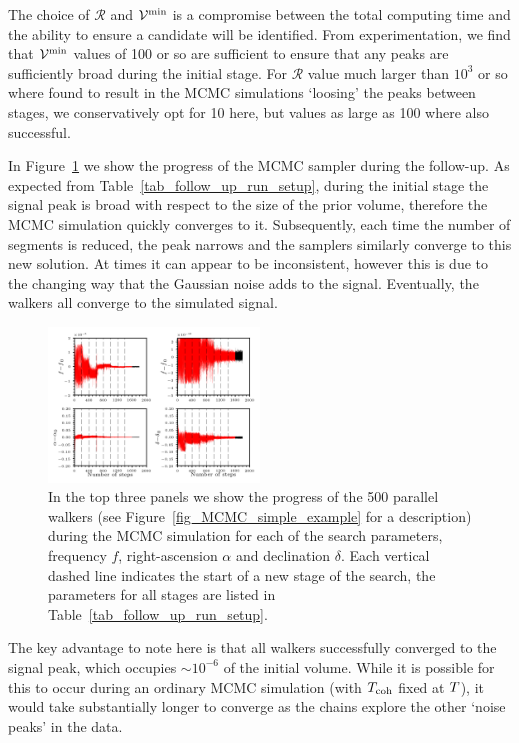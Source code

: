 \documentclass[aps, prd, twocolumn, superscriptaddress, floatfix, showpacs, nofootinbib, longbibliography]{revtex4-1}
\begin{document}
The choice of $\mathcal{R}$ and $\mathcal{V}^{\rm min}$ is a compromise between the
total computing time and the ability to ensure a candidate will be identified.
From experimentation, we find that $\mathcal{V}^{\rm min}$ values of 100 or so are
sufficient to ensure that any peaks are sufficiently broad during the
initial stage. For $\mathcal{R}$ value much larger than $10^{3}$ or so where
found to result in the MCMC simulations `loosing' the peaks between stages, we
conservatively opt for 10 here, but values as large as 100 where also successful.

In Figure~\ref{fig_follow_up} we show the progress of the MCMC sampler during
the follow-up.  As expected from Table~\ref{tab_follow_up_run_setup}, during
the initial stage the signal peak is broad with respect to the size of the
prior volume, therefore the MCMC simulation quickly converges to it. Subsequently,
each time the number of segments is reduced, the peak narrows and the samplers
similarly converge to this new solution. At times it can appear to be inconsistent,
however this is due to the changing way that the Gaussian noise adds to the signal.
Eventually, the walkers all converge to the simulated signal.
\begin{figure}[htb]
\centering
\includegraphics[width=0.5\textwidth]{follow_up_walkers}
\caption{In the top three panels we show the progress of the 500 parallel
walkers (see Figure~\ref{fig_MCMC_simple_example} for a description) during the
MCMC simulation for each of the search parameters, frequency $f$,
right-ascension $\alpha$ and declination $\delta$. Each vertical dashed line indicates the start of a new stage of the search, the parameters for all stages
are listed in Table~\ref{tab_follow_up_run_setup}.}
\label{fig_follow_up}
\end{figure}

The key advantage to note here is that all walkers successfully converged to the
signal peak, which occupies $\sim 10^{-6}$ of the initial volume. While it is
possible for this to occur during an ordinary MCMC simulation (with $T_{\rm coh}$
fixed at $T$), it would take substantially longer to converge as the
chains explore the other `noise peaks' in the data.
\end{document}
